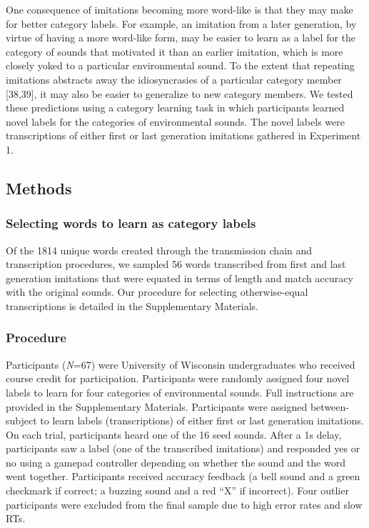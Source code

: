 \documentclass[english,floatsintext,man]{apa6}
\theoremstyle{definition}
\theoremstyle{definition}
\theoremstyle{definition}
\theoremstyle{remark}
\begin{document}
One consequence of imitations becoming more word-like is that they may
make for better category labels. For example, an imitation from a later
generation, by virtue of having a more word-like form, may be easier to
learn as a label for the category of sounds that motivated it than an
earlier imitation, which is more closely yoked to a particular
environmental sound. To the extent that repeating imitations abstracts
away the idiosyncrasies of a particular category member {[}38,39{]}, it
may also be easier to generalize to new category members. We tested
these predictions using a category learning task in which participants
learned novel labels for the categories of environmental sounds. The
novel labels were transcriptions of either first or last generation
imitations gathered in Experiment 1.

\hypertarget{methods-2}{%
\subsection{Methods}\label{methods-2}}

\hypertarget{selecting-words-to-learn-as-category-labels}{%
\subsubsection{Selecting words to learn as category
labels}\label{selecting-words-to-learn-as-category-labels}}

Of the 1814 unique words created through the transmission chain and
transcription procedures, we sampled 56 words transcribed from first and
last generation imitations that were equated in terms of length and
match accuracy with the original sounds. Our procedure for selecting
otherwise-equal transcriptions is detailed in the Supplementary
Materials.

\hypertarget{procedure}{%
\subsubsection{Procedure}\label{procedure}}

Participants (\emph{N}=67) were University of Wisconsin undergraduates
who received course credit for participation. Participants were randomly
assigned four novel labels to learn for four categories of environmental
sounds. Full instructions are provided in the Supplementary Materials.
Participants were assigned between-subject to learn labels
(transcriptions) of either first or last generation imitations. On each
trial, participants heard one of the 16 seed sounds. After a 1s delay,
participants saw a label (one of the transcribed imitations) and
responded yes or no using a gamepad controller depending on whether the
sound and the word went together. Participants received accuracy
feedback (a bell sound and a green checkmark if correct; a buzzing sound
and a red \enquote{X} if incorrect). Four outlier participants were
excluded from the final sample due to high error rates and slow RTs.
\end{document}
